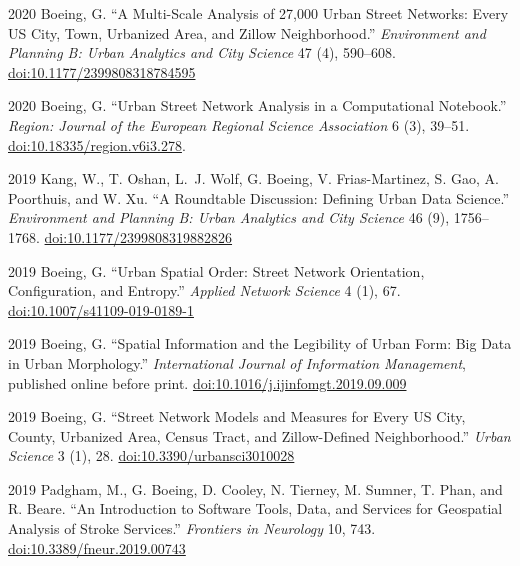 \documentclass[12pt,letterpaper]{report}
\begin{document}
\begin{tablist}
        \item[2020] \tab Boeing, G. \enquote{A Multi-Scale Analysis of 27,000 Urban Street Networks: Every US City, Town, Urbanized Area, and Zillow Neighborhood.} \textit{Environment and Planning B: Urban Analytics and City Science} 47 (4), 590--608. \href{https://doi.org/10.1177/2399808318784595}{doi:10.1177/2399808318784595}

        \item[2020] \tab Boeing, G. \enquote{Urban Street Network Analysis in a Computational Notebook.} \textit{Region: Journal of the European Regional Science Association} 6 (3), 39--51. \href{https://doi.org/10.18335/region.v6i3.278}{doi:10.18335/region.v6i3.278}.

        \item[2019] \tab Kang, W., T. Oshan, L.~J. Wolf, G. Boeing, V. Frias-Martinez, S. Gao, A. Poorthuis, and W. Xu. \enquote{A Roundtable Discussion: Defining Urban Data Science.} \textit{Environment and Planning B: Urban Analytics and City Science} 46 (9), 1756--1768. \href{https://doi.org/10.1177/2399808319882826}{doi:10.1177/2399808319882826}

        \item[2019] \tab Boeing, G. \enquote{Urban Spatial Order: Street Network Orientation, Configuration, and Entropy.} \textit{Applied Network Science} 4 (1), 67. \href{https://doi.org/10.1007/s41109-019-0189-1}{doi:10.1007/s41109-019-0189-1}

        \item[2019] \tab Boeing, G. \enquote{Spatial Information and the Legibility of Urban Form: Big Data in Urban Morphology.} \textit{International Journal of Information Management}, published online before print. \href{https://doi.org/10.1016/j.ijinfomgt.2019.09.009}{doi:10.1016/j.ijinfomgt.2019.09.009}

        \item[2019] \tab Boeing, G. \enquote{Street Network Models and Measures for Every US City, County, Urbanized Area, Census Tract, and Zillow-Defined Neighborhood.} \textit{Urban Science} 3 (1), 28. \href{https://doi.org/10.3390/urbansci3010028}{doi:10.3390/urbansci3010028}

        \item[2019] \tab Padgham, M., G. Boeing, D. Cooley, N. Tierney, M. Sumner, T. Phan, and R. Beare. \enquote{An Introduction to Software Tools, Data, and Services for Geospatial Analysis of Stroke Services.} \textit{Frontiers in Neurology} 10, 743. \href{https://doi.org/10.3389/fneur.2019.00743}{doi:10.3389/fneur.2019.00743}


\end{tablist}
\end{document}
